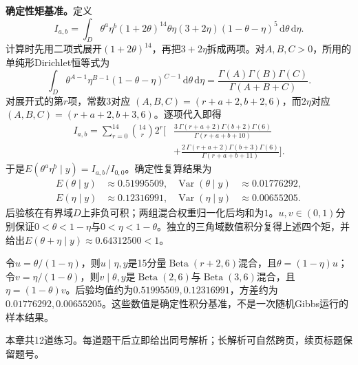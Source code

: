 \begin{solution}
\textbf{确定性矩基准。}定义
\[
I_{a,b}=\int_D \theta^a\eta^b
(1+2\theta)^{14}\theta\eta(3+2\eta)
(1-\theta-\eta)^5\,\mathrm d\theta\,\mathrm d\eta.
\]
计算时先用二项式展开$(1+2\theta)^{14}$，再把$3+2\eta$拆成两项。对$A,B,C>0$，所用的单纯形Dirichlet恒等式为
\[
\int_D\theta^{A-1}\eta^{B-1}(1-\theta-\eta)^{C-1}
\,\mathrm d\theta\,\mathrm d\eta
=\frac{\Gamma(A)\Gamma(B)\Gamma(C)}{\Gamma(A+B+C)}.
\]
对展开式的第$r$项，常数$3$对应
$(A,B,C)=(r+a+2,b+2,6)$，而$2\eta$对应
$(A,B,C)=(r+a+2,b+3,6)$。逐项代入即得
\begin{align}
I_{a,b}
=\sum_{r=0}^{14}\binom{14}{r}2^r\Bigg[
&\frac{3\,\Gamma(r+a+2)\Gamma(b+2)\Gamma(6)}
{\Gamma(r+a+b+10)}\\
&+\frac{2\,\Gamma(r+a+2)\Gamma(b+3)\Gamma(6)}
{\Gamma(r+a+b+11)}\Bigg].
\end{align}
于是$E(\theta^a\eta^b\mid y)=I_{a,b}/I_{0,0}$。确定性复算结果为
\begin{align*}
E(\theta\mid y)&\approx0.51995509,
&\operatorname{Var}(\theta\mid y)&\approx0.01776292,\\
E(\eta\mid y)&\approx0.12316991,
&\operatorname{Var}(\eta\mid y)&\approx0.00655205.
\end{align*}
\SolCheck 后验核在有界域$D$上非负可积；两组混合权重归一化后均和为$1$。$u,v\in(0,1)$分别保证$0<\theta<1-\eta$与$0<\eta<1-\theta$。独立的三角域数值积分复得上述四个矩，并给出$E(\theta+\eta\mid y)\approx0.64312500<1$。

\SolAnswer 令$u=\theta/(1-\eta)$，则$u\mid\eta,y$是15分量$\operatorname{Beta}(r+2,6)$混合，且$\theta=(1-\eta)u$；令$v=\eta/(1-\theta)$，则$v\mid\theta,y$是$\operatorname{Beta}(2,6)$与$\operatorname{Beta}(3,6)$混合，且$\eta=(1-\theta)v$。后验均值约为$0.51995509,0.12316991$，方差约为$0.01776292,0.00655205$。这些数值是确定性积分基准，不是一次随机Gibbs运行的样本结果。
\end{solution}

\label{struct:V5-C04-CH34}
\begin{chapterexercisebox}
\label{struct:V5-C04-CH35}
本章共12道练习。每道题干后立即给出同号解析；长解析可自然跨页，续页标题保留题号。
\end{chapterexercisebox}

